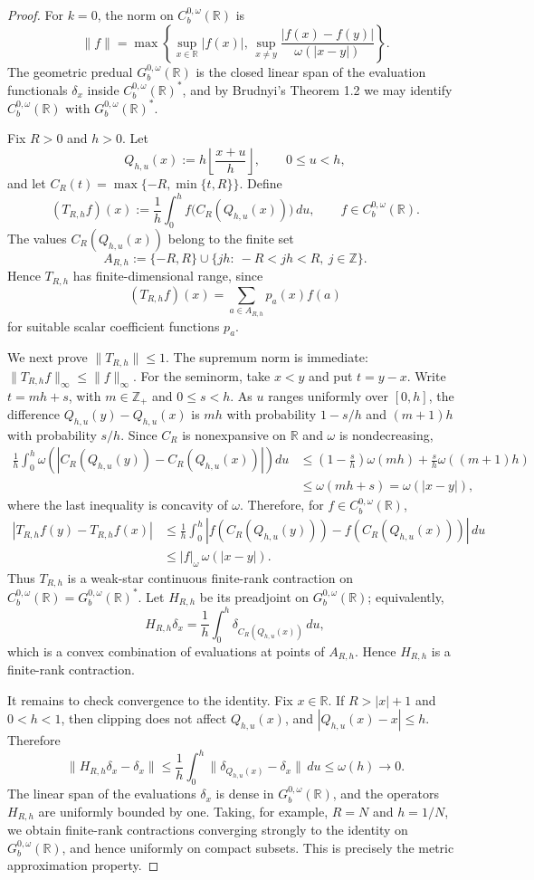 \documentclass[11pt]{article}
\newcommand{\R}{\mathbb R}
\newcommand{\Gb}{G_b^{0,\omega}}
\newcommand{\Cb}{C_b^{0,\omega}}
\begin{document}
\begin{proof}
For \(k=0\), the norm on \(C_b^{0,\omega}(\R)\) is
\[
 \|f\|=\max\left\{\sup_{x\in\R}|f(x)|,\,
 \sup_{x\ne y}\frac{|f(x)-f(y)|}{\omega(|x-y|)}\right\}.
\]
The geometric predual \(\Gb(\R)\) is the closed linear span of the evaluation
functionals \(\delta_x\) inside \(\Cb(\R)^*\), and by Brudnyi's Theorem 1.2
we may identify \(\Cb(\R)\) with \(\Gb(\R)^*\).

Fix \(R>0\) and \(h>0\).  Let
\[
 Q_{h,u}(x):=h\left\lfloor\frac{x+u}{h}\right\rfloor,\qquad 0\le u<h,
\]
and let \(C_R(t)=\max\{-R,\min\{t,R\}\}\).  Define
\[
 (T_{R,h}f)(x)
   :=\frac1h\int_0^h f\bigl(C_R(Q_{h,u}(x))\bigr)\,du,
   \qquad f\in \Cb(\R).
\]
The values \(C_R(Q_{h,u}(x))\) belong to the finite set
\[
 A_{R,h}:=\{-R,R\}\cup \{jh:\ -R<jh<R,\ j\in\mathbb Z\}.
\]
Hence \(T_{R,h}\) has finite-dimensional range, since
\[
 (T_{R,h}f)(x)=\sum_{a\in A_{R,h}}p_a(x)f(a)
\]
for suitable scalar coefficient functions \(p_a\).

We next prove \(\|T_{R,h}\|\le 1\).  The supremum norm is immediate:
\(\|T_{R,h}f\|_\infty\le \|f\|_\infty\).  For the seminorm, take
\(x<y\) and put \(t=y-x\).  Write \(t=mh+s\), with \(m\in\mathbb Z_+\) and
\(0\le s<h\).  As \(u\) ranges uniformly over \([0,h]\), the difference
\(Q_{h,u}(y)-Q_{h,u}(x)\) is \(mh\) with probability \(1-s/h\) and
\((m+1)h\) with probability \(s/h\).  Since \(C_R\) is nonexpansive on
\(\R\) and \(\omega\) is nondecreasing,
\[
\begin{aligned}
 \frac1h\int_0^h
   \omega\!\left(\left|C_R(Q_{h,u}(y))-C_R(Q_{h,u}(x))\right|\right)du
 &\le
 \left(1-\frac{s}{h}\right)\omega(mh)
   +\frac{s}{h}\omega((m+1)h)\\
 &\le \omega(mh+s)=\omega(|x-y|),
\end{aligned}
\]
where the last inequality is concavity of \(\omega\).  Therefore, for
\(f\in\Cb(\R)\),
\[
\begin{aligned}
 |T_{R,h}f(y)-T_{R,h}f(x)|
 &\le
 \frac1h\int_0^h
 |f(C_R(Q_{h,u}(y)))-f(C_R(Q_{h,u}(x)))|\,du\\
 &\le |f|_{\omega}\,\omega(|x-y|).
\end{aligned}
\]
Thus \(T_{R,h}\) is a weak-star continuous finite-rank contraction on
\(\Cb(\R)=\Gb(\R)^*\).  Let \(H_{R,h}\) be its preadjoint on \(\Gb(\R)\);
equivalently,
\[
 H_{R,h}\delta_x
   =\frac1h\int_0^h \delta_{C_R(Q_{h,u}(x))}\,du,
\]
which is a convex combination of evaluations at points of \(A_{R,h}\).
Hence \(H_{R,h}\) is a finite-rank contraction.

It remains to check convergence to the identity.  Fix \(x\in\R\).  If
\(R>|x|+1\) and \(0<h<1\), then clipping does not affect
\(Q_{h,u}(x)\), and \(|Q_{h,u}(x)-x|\le h\).  Therefore
\[
 \|H_{R,h}\delta_x-\delta_x\|
 \le \frac1h\int_0^h \|\delta_{Q_{h,u}(x)}-\delta_x\|\,du
 \le \omega(h)\to 0.
\]
The linear span of the evaluations \(\delta_x\) is dense in \(\Gb(\R)\), and
the operators \(H_{R,h}\) are uniformly bounded by one.  Taking, for example,
\(R=N\) and \(h=1/N\), we obtain finite-rank contractions converging strongly
to the identity on \(\Gb(\R)\), and hence uniformly on compact subsets.  This
is precisely the metric approximation property.
\end{proof}
\end{document}
